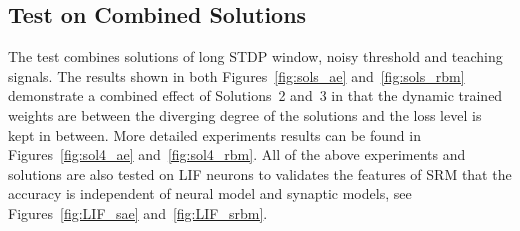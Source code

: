 \subsection{Test on Combined Solutions}
The test combines solutions of long STDP window, noisy threshold and teaching signals.
The results shown in both Figures~\ref{fig:sols_ae} and~\ref{fig:sols_rbm} demonstrate a combined effect of Solutions~2 and~3 in that the dynamic trained weights are between the diverging degree of the solutions and the loss level is kept in between.
More detailed experiments results can be found in Figures~\ref{fig:sol4_ae} and~\ref{fig:sol4_rbm}.
All of the above experiments and solutions are also tested on LIF neurons to validates the features of SRM that the accuracy is independent of neural model and synaptic models, see Figures~\ref{fig:LIF_sae} and~\ref{fig:LIF_srbm}.
